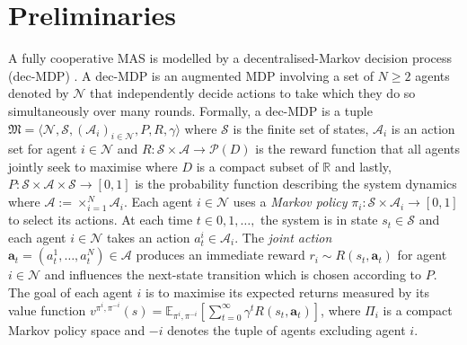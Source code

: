 \documentclass{article}
\begin{document}
\section{Preliminaries}
% 
A fully cooperative MAS is modelled by a decentralised-Markov decision process (dec-MDP) \cite{yang2020overview}. A dec-MDP is an augmented MDP involving a set of $N\geq 2$  agents denoted by $\mathcal{N}$ that independently decide actions to take which they do so simultaneously over many rounds. Formally, a dec-MDP is a tuple $\mathfrak{M}=\langle \mathcal{N},\mathcal{S},\left(\mathcal{A}_{i}\right)_{i\in\mathcal{N}},P,R,\gamma\rangle$ where $\mathcal{S}$ is the finite set of states, $\mathcal{A}_i$ is an action set for agent $i\in\mathcal{N}$ and $R:\mathcal{S}\times\boldsymbol{\mathcal{A}}\to\mathcal{P}(D)$ is the reward function that all agents jointly seek to maximise where $D$ is a compact subset of $\mathbb{R}$ and lastly, $P:\mathcal{S} \times \boldsymbol{\mathcal{A}} \times \mathcal{S} \rightarrow [0, 1]$ is the probability function describing the system dynamics where $\boldsymbol{\mathcal{A}}:=\times_{i=1}^N\mathcal{A}_i$.  Each agent $i\in\mathcal{N}$ uses a \textit{Markov policy}
$\pi_{i}: \mathcal{S} \times \mathcal{A}_i \rightarrow [0,1]$ to select its actions. At each time $t\in 0,1,\ldots,$ the system is in state $s_t\in\mathcal{S}$ and each agent $i\in\mathcal{N}$ takes an action $a^i_t\in\mathcal{A}_i$. The \textit{joint action}\ $\boldsymbol{a}_t=(a^1_t,\ldots, a^N_t)\in\boldsymbol{\mathcal{A}}$  produces an immediate reward $r_i\sim R(s_t,\boldsymbol{a}_t)$ for agent $i\in\mathcal{N}$ and influences the next-state transition which is chosen according to $P$.  
The goal of each agent $i$ is to maximise its expected returns measured by its value function $v^{\pi^i,\pi^{-i}}(s)=\mathbb{E}_{\pi^i,\pi^{-i}}\left[\sum_{t=0}^\infty \gamma^tR(s_t,\boldsymbol{a}_t)\right]$,
where $\Pi_i$ is a compact Markov policy space and $-i$ denotes the tuple of agents excluding agent $i$.
\end{document}
